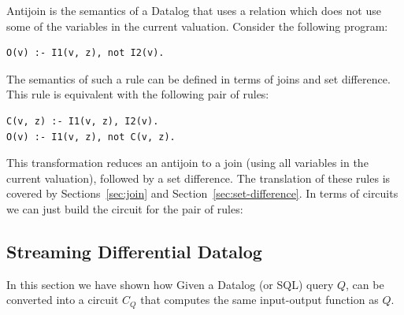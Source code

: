 Antijoin is the semantics of a Datalog  that uses a relation
which does not use some of the variables in the current valuation.
Consider the following program:

\begin{lstlisting}[language=ddlog]
O(v) :- I1(v, z), not I2(v).
\end{lstlisting}

The semantics of such a rule can be defined in terms of joins and set difference.
This rule is equivalent with the following pair of rules:

\begin{lstlisting}[language=ddlog]
C(v, z) :- I1(v, z), I2(v).
O(v) :- I1(v, z), not C(v, z).
\end{lstlisting}

This transformation reduces an antijoin to a join (using all variables in the current valuation),
followed by a set difference.  The translation of these rules is covered by Sections~\ref{sec:join} and
Section~\ref{sec:set-difference}.  In terms of circuits we can just build the circuit
for the pair of rules:


\subsection{Streaming Differential Datalog}\label{sec:ddlog}

In this section we have shown how Given a Datalog (or SQL) query $Q$,
can be converted into a circuit $C_Q$ that computes the same input-output function as $Q$.


